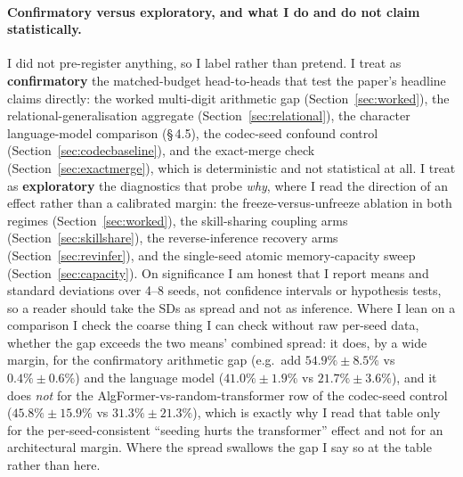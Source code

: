 \documentclass[11pt]{article}
\begin{document}
\paragraph{Confirmatory versus exploratory, and what I do and do not claim statistically.} I did not
pre-register anything, so I label rather than pretend. I treat as \textbf{confirmatory} the matched-budget
head-to-heads that test the paper's headline claims directly: the worked multi-digit arithmetic gap
(Section~\ref{sec:worked}), the relational-generalisation aggregate (Section~\ref{sec:relational}), the
character language-model comparison (\S\,4.5), the codec-seed confound control (Section~\ref{sec:codecbaseline}),
and the exact-merge check (Section~\ref{sec:exactmerge}), which is deterministic and not statistical at
all. I treat as \textbf{exploratory} the diagnostics that probe \emph{why}, where I read the direction of
an effect rather than a calibrated margin: the freeze-versus-unfreeze ablation in both regimes
(Section~\ref{sec:worked}), the skill-sharing coupling arms (Section~\ref{sec:skillshare}), the
reverse-inference recovery arms (Section~\ref{sec:revinfer}), and the single-seed atomic memory-capacity
sweep (Section~\ref{sec:capacity}). On significance I am honest that I report
means and standard deviations over 4--8 seeds, not confidence intervals or hypothesis tests, so a reader
should take the SDs as spread and not as inference. Where I lean on a comparison I check the coarse thing
I can check without raw per-seed data, whether the gap exceeds the two means' combined spread: it does,
by a wide margin, for the confirmatory arithmetic gap (e.g.\ add $54.9\%\pm8.5\%$ vs $0.4\%\pm0.6\%$) and
the language model ($41.0\%\pm1.9\%$ vs $21.7\%\pm3.6\%$), and it does \emph{not} for the AlgFormer-vs-random-transformer
row of the codec-seed control ($45.8\%\pm15.9\%$ vs $31.3\%\pm21.3\%$), which is exactly why I read that
table only for the per-seed-consistent ``seeding hurts the transformer'' effect and not for an
architectural margin. Where the spread swallows the gap I say so at the table rather than here.
\end{document}
